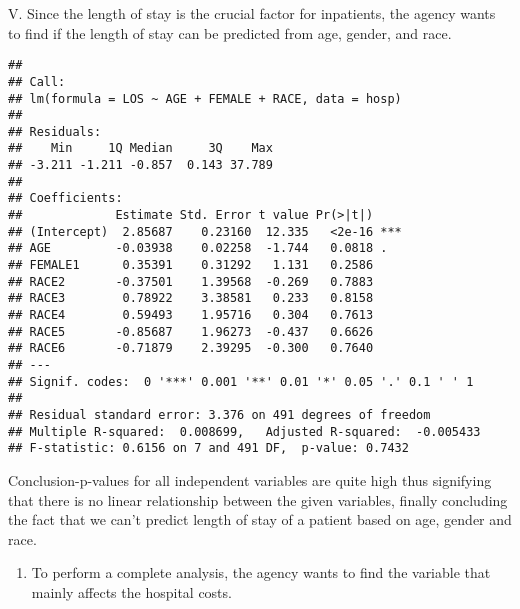 \documentclass[
]{article}
\newenvironment{Shaded}{\begin{snugshade}}{\end{snugshade}}
\newcommand{\DataTypeTok}[1]{\textcolor[rgb]{0.13,0.29,0.53}{#1}}
\newcommand{\KeywordTok}[1]{\textcolor[rgb]{0.13,0.29,0.53}{\textbf{#1}}}
\newcommand{\NormalTok}[1]{#1}
\newcommand{\OperatorTok}[1]{\textcolor[rgb]{0.81,0.36,0.00}{\textbf{#1}}}
\providecommand{\tightlist}{%
  \setlength{\itemsep}{0pt}\setlength{\parskip}{0pt}}
\begin{document}
V. Since the length of stay is the crucial factor for inpatients, the
agency wants to find if the length of stay can be predicted from age,
gender, and race.

\begin{Shaded}
\end{Shaded}

\begin{verbatim}
## 
## Call:
## lm(formula = LOS ~ AGE + FEMALE + RACE, data = hosp)
## 
## Residuals:
##    Min     1Q Median     3Q    Max 
## -3.211 -1.211 -0.857  0.143 37.789 
## 
## Coefficients:
##             Estimate Std. Error t value Pr(>|t|)    
## (Intercept)  2.85687    0.23160  12.335   <2e-16 ***
## AGE         -0.03938    0.02258  -1.744   0.0818 .  
## FEMALE1      0.35391    0.31292   1.131   0.2586    
## RACE2       -0.37501    1.39568  -0.269   0.7883    
## RACE3        0.78922    3.38581   0.233   0.8158    
## RACE4        0.59493    1.95716   0.304   0.7613    
## RACE5       -0.85687    1.96273  -0.437   0.6626    
## RACE6       -0.71879    2.39295  -0.300   0.7640    
## ---
## Signif. codes:  0 '***' 0.001 '**' 0.01 '*' 0.05 '.' 0.1 ' ' 1
## 
## Residual standard error: 3.376 on 491 degrees of freedom
## Multiple R-squared:  0.008699,   Adjusted R-squared:  -0.005433 
## F-statistic: 0.6156 on 7 and 491 DF,  p-value: 0.7432
\end{verbatim}

Conclusion-p-values for all independent variables are quite high thus
signifying that there is no linear relationship between the given
variables, finally concluding the fact that we can't predict length of
stay of a patient based on age, gender and race.

\begin{enumerate}
\def\labelenumi{\Roman{enumi}.}
\setcounter{enumi}{5}
\tightlist
\item
  To perform a complete analysis, the agency wants to find the variable
  that mainly affects the hospital costs.
\end{enumerate}
\end{document}
